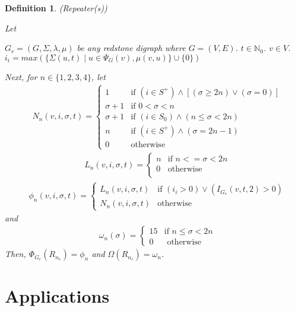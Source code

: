 \documentclass{article}
\newtheorem{defn}{Definition}[section]
\begin{document}
\begin{defn} (Repeater(s))
	
	Let
	\begin{outline}
	\1 \(G_{r} = (G, \Sigma, \lambda, \mu)\) be any redstone digraph where \(G = (V, E)\).
	\1 \(t \in \mathbb{N}_{0}\).
	\1 \(v \in V\).
	\1 \(i_{i} = max(\{\Sigma(u, t) \mid u \in \Psi_{G}(v), \mu(v, u)\} \cup \{0\})\)
	\end{outline}
	Next, for \(n \in \{1, 2, 3, 4\}\), let
	\begin{align}
		& N_{n}(v, i, \sigma, t) = 
		\begin{cases}
			1		   & \text{if }	 (i \in S^+) \land [(\sigma \geq 2n) \vee (\sigma = 0)]\\
			\sigma + 1 & \text{if }	 0 < \sigma < n \\
			\sigma + 1 & \text{if }	 (i \in S_{0}) \land (n \leq \sigma < 2n) \\
			n		   & \text{if }	 (i \in S^+) \land (\sigma = 2n - 1) \\
			0		   & \text{otherwise}
		\end{cases}
	\end{align}
	\begin{align}
		& L_{n}(v, i, \sigma, t) = 
		\begin{cases}
			n & \text{if }	n <= \sigma < 2n \\
			0 & \text{otherwise} \\
		\end{cases}
	\end{align}
	\begin{align}
		& \phi_{n}(v, i, \sigma, t) = 
		\begin{cases}
			L_{n}(v, i, \sigma, t) & \text{if } (i_{i} > 0) \vee (I_{G_{r}}(v, t, 2) > 0)\\
			N_{n}(v, i, \sigma, t) & \text{otherwise}
		\end{cases}
	\end{align}	
	and
	\begin{align}
		& \omega_{n}(\sigma) = 
		\begin{cases}
			15 & \text{if } n \leq \sigma < 2n \\
			0 & \text{ otherwise }
			\end{cases}
	\end{align}
	Then, \(\Phi_{G_{r}}(R_{n_c}) = \phi_{n}\) and \(\Omega(R_{n_{c}}) = \omega_{n}\).
\end{defn}

\section{Applications}
\end{document}
